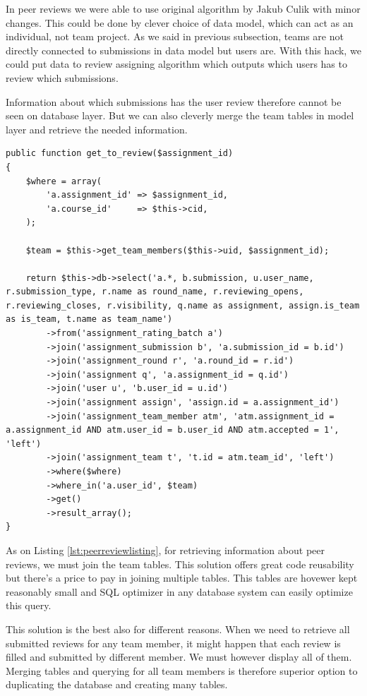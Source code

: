 In peer reviews we were able to use original algorithm by Jakub Culik \cite{culik} with minor changes. This could be done by clever choice of data model, which can act as an individual, not team project. As we said in previous subsection, teams are not directly connected to submissions in data model but users are. With this hack, we could put data to review assigning algorithm which outputs which users has to review which submissions.

Information about which submissions has the user review therefore cannot be seen on database layer. But we can also cleverly merge the team tables in model layer and retrieve the needed information.

\begin{lstlisting}[caption={Retrieving information about peer reviews},label={lst:peerreviewlisting}]
public function get_to_review($assignment_id)
{
    $where = array(
        'a.assignment_id' => $assignment_id,
        'a.course_id'     => $this->cid,
    );

    $team = $this->get_team_members($this->uid, $assignment_id);

    return $this->db->select('a.*, b.submission, u.user_name, r.submission_type, r.name as round_name, r.reviewing_opens, r.reviewing_closes, r.visibility, q.name as assignment, assign.is_team as is_team, t.name as team_name')
        ->from('assignment_rating_batch a')
        ->join('assignment_submission b', 'a.submission_id = b.id')
        ->join('assignment_round r', 'a.round_id = r.id')
        ->join('assignment q', 'a.assignment_id = q.id')
        ->join('user u', 'b.user_id = u.id')
        ->join('assignment assign', 'assign.id = a.assignment_id')
        ->join('assignment_team_member atm', 'atm.assignment_id = a.assignment_id AND atm.user_id = b.user_id AND atm.accepted = 1', 'left')
        ->join('assignment_team t', 't.id = atm.team_id', 'left')
        ->where($where)
        ->where_in('a.user_id', $team)
        ->get()
        ->result_array();
}
\end{lstlisting}

As on Listing \ref{lst:peerreviewlisting}, for retrieving information about peer reviews, we must join the team tables. This solution offers great code reusability but there's a price to pay in joining multiple tables. This tables are hovewer kept reasonably small and SQL optimizer in any database system can easily optimize this query.

This solution is the best also for different reasons. When we need to retrieve all submitted reviews for any team member, it might happen that each review is filled and submitted by different member. We must however display all of them. Merging tables and querying for all team members is therefore superior option to duplicating the database and creating many tables.  

